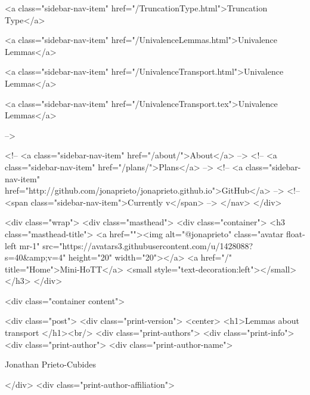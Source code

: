       
    
      
        
          <a class="sidebar-nav-item" href="/TruncationType.html">Truncation Type</a>
        
      
    
      
        
          <a class="sidebar-nav-item" href="/UnivalenceLemmas.html">Univalence Lemmas</a>
        
      
    
      
        
          <a class="sidebar-nav-item" href="/UnivalenceTransport.html">Univalence Lemmas</a>
        
      
    
      
        
          <a class="sidebar-nav-item" href="/UnivalenceTransport.tex">Univalence Lemmas</a>
        
      
     -->

    <!-- <a class="sidebar-nav-item" href="/about/">About</a> -->
    <!-- <a class="sidebar-nav-item" href="/plans/">Plans</a> -->
    <!-- <a class="sidebar-nav-item" href="http://github.com/jonaprieto/jonaprieto.github.io">GitHub</a> -->
    <!-- <span class="sidebar-nav-item">Currently v</span> -->
  </nav>
</div>

    <div class="wrap">
      <div class="masthead">
        <div class="container">
          <h3 class="masthead-title">
            <a href=""><img alt="@jonaprieto" class="avatar float-left mr-1" src="https://avatars3.githubusercontent.com/u/1428088?s=40&amp;v=4" height="20" width="20"></a>
            <a href="/" title="Home">Mini-HoTT</a>
            <small style="text-decoration:left"></small>
          </h3>
        </div>
      
      <div class="container content">
        







<div class="post">
  <div class="print-version">
    <center>
      <h1>Lemmas about transport </h1><br/>
        <div class="print-authors">
          <div class="print-info">
            <div class="print-author">
              <div class="print-author-name">
                
                  Jonathan Prieto-Cubides
                
              </div>
              <div class="print-author-affiliation">
                
